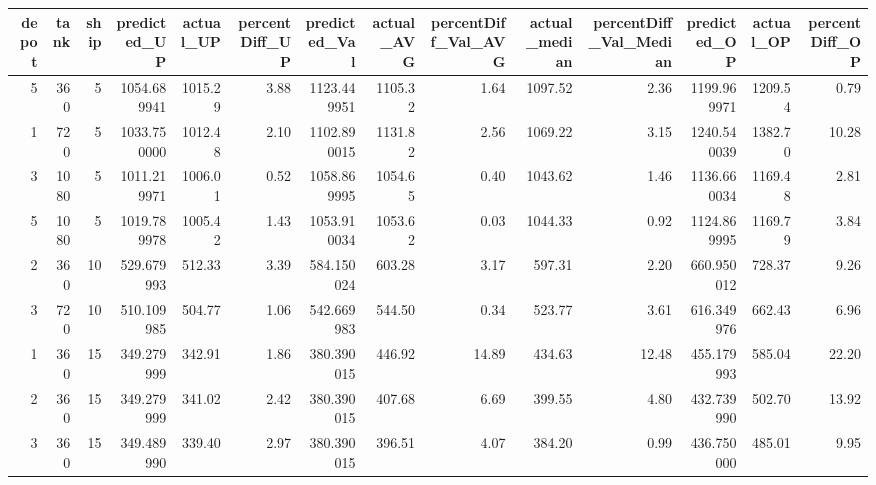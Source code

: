 \begin{tabular}{rrrrrrrrrrrrrr}
\toprule
 depot &  tank &  ship &  predicted\_UP &  actual\_UP &  percentDiff\_UP &  predicted\_Val &  actual\_AVG &  percentDiff\_Val\_AVG &  actual\_median &  percentDiff\_Val\_Median &  predicted\_OP &  actual\_OP &  percentDiff\_OP \\
\midrule
     5 &   360 &     5 &   1054.689941 &    1015.29 &            3.88 &    1123.449951 &     1105.32 &                 1.64 &        1097.52 &                    2.36 &   1199.969971 &    1209.54 &            0.79 \\
     1 &   720 &     5 &   1033.750000 &    1012.48 &            2.10 &    1102.890015 &     1131.82 &                 2.56 &        1069.22 &                    3.15 &   1240.540039 &    1382.70 &           10.28 \\
     3 &  1080 &     5 &   1011.219971 &    1006.01 &            0.52 &    1058.869995 &     1054.65 &                 0.40 &        1043.62 &                    1.46 &   1136.660034 &    1169.48 &            2.81 \\
     5 &  1080 &     5 &   1019.789978 &    1005.42 &            1.43 &    1053.910034 &     1053.62 &                 0.03 &        1044.33 &                    0.92 &   1124.869995 &    1169.79 &            3.84 \\
     2 &   360 &    10 &    529.679993 &     512.33 &            3.39 &     584.150024 &      603.28 &                 3.17 &         597.31 &                    2.20 &    660.950012 &     728.37 &            9.26 \\
     3 &   720 &    10 &    510.109985 &     504.77 &            1.06 &     542.669983 &      544.50 &                 0.34 &         523.77 &                    3.61 &    616.349976 &     662.43 &            6.96 \\
     1 &   360 &    15 &    349.279999 &     342.91 &            1.86 &     380.390015 &      446.92 &                14.89 &         434.63 &                   12.48 &    455.179993 &     585.04 &           22.20 \\
     2 &   360 &    15 &    349.279999 &     341.02 &            2.42 &     380.390015 &      407.68 &                 6.69 &         399.55 &                    4.80 &    432.739990 &     502.70 &           13.92 \\
     3 &   360 &    15 &    349.489990 &     339.40 &            2.97 &     380.390015 &      396.51 &                 4.07 &         384.20 &                    0.99 &    436.750000 &     485.01 &            9.95 \\

\end{tabular}
